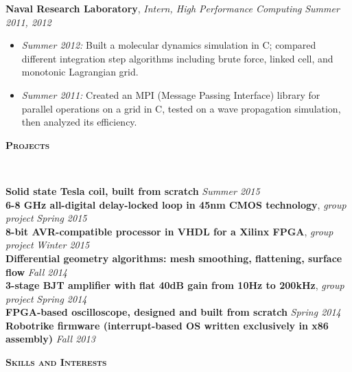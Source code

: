 \documentclass{article}
\newenvironment{changemargin}[2]{%
  \begin{list}{}{%
    \setlength{\topsep}{0pt}%
    \setlength{\leftmargin}{#1}%
    \setlength{\rightmargin}{#2}%
    \setlength{\listparindent}{\parindent}%
    \setlength{\itemindent}{\parindent}%
    \setlength{\parsep}{\parskip}%
  }%
  \item[]}{\end{list}
}
\newcommand{\lineover}{
	\begin{changemargin}{-0.05in}{-0.05in}
		\vspace*{-8pt}
		\hrulefill \\
		\vspace*{-2pt}
	\end{changemargin}
}
\newcommand{\header}[1]{
	\begin{changemargin}{-.5in}{-0.5in}
		{\large \textbf{\scshape{#1}}}\\
  	\lineover
	\end{changemargin}
}
\newenvironment{body} {
	\vspace*{-16pt}
	\begin{changemargin}{-0.25in}{-0.5in}
  }	
	{\end{changemargin}
}
\newcommand{\CC}{C\nolinebreak\hspace{-.05em}\raisebox{.4ex}{\tiny\bf +}\nolinebreak\hspace{-.10em}\raisebox{.4ex}{\tiny\bf +}}
\begin{document}
\begin{body}
	\textbf{Naval Research Laboratory}, \emph{Intern, High Performance Computing} \hfill \emph{Summer 2011, 2012}\\
	\vspace*{-4pt}
	\begin{itemize}
		\item \emph{Summer 2012:} Built a molecular dynamics simulation in C; compared different integration step algorithms including brute force, linked cell, and monotonic Lagrangian grid.
		\item \emph{Summer 2011:} Created an MPI (Message Passing Interface) library for parallel operations on a grid in \CC, tested on a wave propagation simulation, then analyzed its efficiency.
	\end{itemize}
\end{body}

\smallskip

\header{Projects}
\begin{body}
	\vspace{14pt}
	\textbf{Solid state Tesla coil, built from scratch} \hfill \emph{Summer 2015} \\
	\textbf{6-8 GHz all-digital delay-locked loop in 45nm CMOS technology}, \emph{group project} \hfill \emph{Spring 2015}\\
	\textbf{8-bit AVR-compatible processor in VHDL for a Xilinx FPGA}, \emph{group project} \hfill \emph{Winter 2015}\\
	\textbf{Differential geometry algorithms: mesh smoothing, flattening, surface flow} \hfill \emph{Fall 2014}\\
	\textbf{3-stage BJT amplifier with flat 40dB gain from 10Hz to 200kHz}, \emph{group project} \hfill \emph{Spring 2014}\\
	\textbf{FPGA-based oscilloscope, designed and built from scratch} \hfill \emph{Spring 2014}\\
	\textbf{Robotrike firmware (interrupt-based OS written exclusively in x86 assembly)} \hfill \emph{Fall 2013}\\
\end{body}

\smallskip
\smallskip

\header{Skills and Interests}
\end{document}
